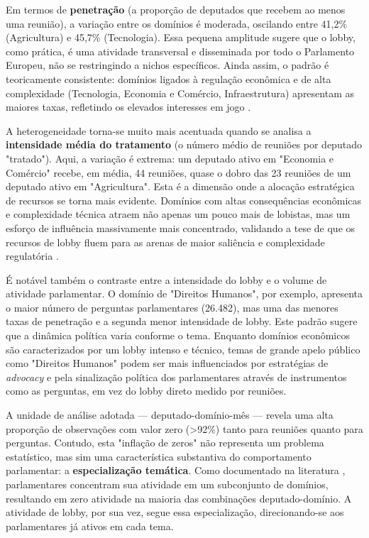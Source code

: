 Em termos de \textbf{penetração} (a proporção de deputados que recebem ao menos uma reunião), a variação entre os domínios é moderada, oscilando entre 41,2\% (Agricultura) e 45,7\% (Tecnologia). Essa pequena amplitude sugere que o lobby, como prática, é uma atividade transversal e disseminada por todo o Parlamento Europeu, não se restringindo a nichos específicos. Ainda assim, o padrão é teoricamente consistente: domínios ligados à regulação econômica e de alta complexidade (Tecnologia, Economia e Comércio, Infraestrutura) apresentam as maiores taxas, refletindo os elevados interesses em jogo \cite{mahoney_lobbying_2007}.

A heterogeneidade torna-se muito mais acentuada quando se analisa a \textbf{intensidade média do tratamento} (o número médio de reuniões por deputado "tratado"). Aqui, a variação é extrema: um deputado ativo em "Economia e Comércio" recebe, em média, 44 reuniões, quase o dobro das 23 reuniões de um deputado ativo em "Agricultura". Esta é a dimensão onde a alocação estratégica de recursos se torna mais evidente. Domínios com altas consequências econômicas e complexidade técnica atraem não apenas um pouco mais de lobistas, mas um esforço de influência massivamente mais concentrado, validando a tese de que os recursos de lobby fluem para as arenas de maior saliência e complexidade regulatória \cite{kluver_informational_2012}.

É notável também o contraste entre a intensidade do lobby e o volume de atividade parlamentar. O domínio de "Direitos Humanos", por exemplo, apresenta o maior número de perguntas parlamentares (26.482), mas uma das menores taxas de penetração e a segunda menor intensidade de lobby. Este padrão sugere que a dinâmica política varia conforme o tema. Enquanto domínios econômicos são caracterizados por um lobby intenso e técnico, temas de grande apelo público como "Direitos Humanos" podem ser mais influenciados por estratégias de \textit{advocacy} e pela sinalização política dos parlamentares através de instrumentos como as perguntas, em vez do lobby direto medido por reuniões.

A unidade de análise adotada — deputado-domínio-mês — revela uma alta proporção de observações com valor zero (>92\%) tanto para reuniões quanto para perguntas. Contudo, esta "inflação de zeros" não representa um problema estatístico, mas sim uma característica substantiva do comportamento parlamentar: a \textbf{especialização temática}. Como documentado na literatura \cite{schiller1995senators, burden2015personal}, parlamentares concentram sua atividade em um subconjunto de domínios, resultando em zero atividade na maioria das combinações deputado-domínio. A atividade de lobby, por sua vez, segue essa especialização, direcionando-se aos parlamentares já ativos em cada tema.

